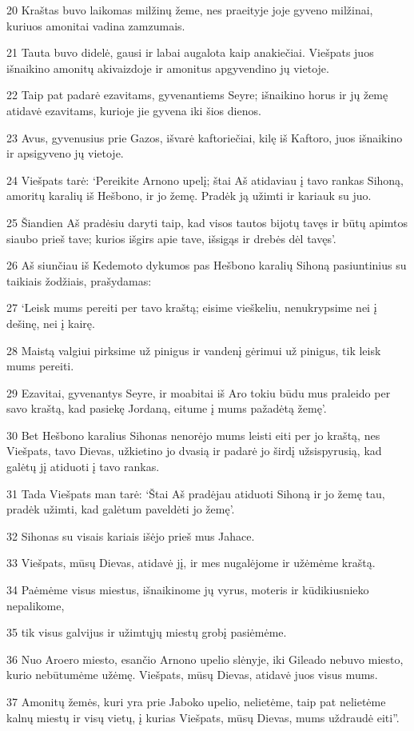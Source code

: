 \par 20 Kraštas buvo laikomas milžinų žeme, nes praeityje joje gyveno milžinai, kuriuos amonitai vadina zamzumais. 
\par 21 Tauta buvo didelė, gausi ir labai augalota kaip anakiečiai. Viešpats juos išnaikino amonitų akivaizdoje ir amonitus apgyvendino jų vietoje. 
\par 22 Taip pat padarė ezavitams, gyvenantiems Seyre; išnaikino horus ir jų žemę atidavė ezavitams, kurioje jie gyvena iki šios dienos. 
\par 23 Avus, gyvenusius prie Gazos, išvarė kaftoriečiai, kilę iš Kaftoro, juos išnaikino ir apsigyveno jų vietoje. 
\par 24 Viešpats tarė: ‘Pereikite Arnono upelį; štai Aš atidaviau į tavo rankas Sihoną, amoritų karalių iš Hešbono, ir jo žemę. Pradėk ją užimti ir kariauk su juo. 
\par 25 Šiandien Aš pradėsiu daryti taip, kad visos tautos bijotų tavęs ir būtų apimtos siaubo prieš tave; kurios išgirs apie tave, išsigąs ir drebės dėl tavęs’. 
\par 26 Aš siunčiau iš Kedemoto dykumos pas Hešbono karalių Sihoną pasiuntinius su taikiais žodžiais, prašydamas: 
\par 27 ‘Leisk mums pereiti per tavo kraštą; eisime vieškeliu, nenukrypsime nei į dešinę, nei į kairę. 
\par 28 Maistą valgiui pirksime už pinigus ir vandenį gėrimui už pinigus, tik leisk mums pereiti. 
\par 29 Ezavitai, gyvenantys Seyre, ir moabitai iš Aro tokiu būdu mus praleido per savo kraštą, kad pasiekę Jordaną, eitume į mums pažadėtą žemę’. 
\par 30 Bet Hešbono karalius Sihonas nenorėjo mums leisti eiti per jo kraštą, nes Viešpats, tavo Dievas, užkietino jo dvasią ir padarė jo širdį užsispyrusią, kad galėtų jį atiduoti į tavo rankas. 
\par 31 Tada Viešpats man tarė: ‘Štai Aš pradėjau atiduoti Sihoną ir jo žemę tau, pradėk užimti, kad galėtum paveldėti jo žemę’. 
\par 32 Sihonas su visais kariais išėjo prieš mus Jahace. 
\par 33 Viešpats, mūsų Dievas, atidavė jį, ir mes nugalėjome ir užėmėme kraštą. 
\par 34 Paėmėme visus miestus, išnaikinome jų vyrus, moteris ir kūdikius­nieko nepalikome, 
\par 35 tik visus galvijus ir užimtųjų miestų grobį pasiėmėme. 
\par 36 Nuo Aroero miesto, esančio Arnono upelio slėnyje, iki Gileado nebuvo miesto, kurio nebūtumėme užėmę. Viešpats, mūsų Dievas, atidavė juos visus mums. 
\par 37 Amonitų žemės, kuri yra prie Jaboko upelio, nelietėme, taip pat nelietėme kalnų miestų ir visų vietų, į kurias Viešpats, mūsų Dievas, mums uždraudė eiti”.



